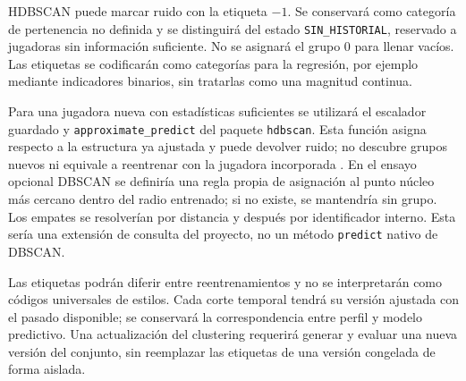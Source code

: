 HDBSCAN puede marcar ruido con la etiqueta $-1$. Se conservará como categoría de pertenencia no definida y se distinguirá del estado \texttt{SIN\_\allowbreak HISTORIAL}, reservado a jugadoras sin información suficiente. No se asignará el grupo 0 para llenar vacíos. Las etiquetas se codificarán como categorías para la regresión, por ejemplo mediante indicadores binarios, sin tratarlas como una magnitud continua.

Para una jugadora nueva con estadísticas suficientes se utilizará el escalador guardado y \texttt{approximate\_\allowbreak predict} del paquete \texttt{hdbscan}. Esta función asigna respecto a la estructura ya ajustada y puede devolver ruido; no descubre grupos nuevos ni equivale a reentrenar con la jugadora incorporada \cite{hdbscanPrediccionPerfiles}. En el ensayo opcional DBSCAN se definiría una regla propia de asignación al punto núcleo más cercano dentro del radio entrenado; si no existe, se mantendría sin grupo. Los empates se resolverían por distancia y después por identificador interno. Esta sería una extensión de consulta del proyecto, no un método \texttt{predict} nativo de DBSCAN.

Las etiquetas podrán diferir entre reentrenamientos y no se interpretarán como códigos universales de estilos. Cada corte temporal tendrá su versión ajustada con el pasado disponible; se conservará la correspondencia entre perfil y modelo predictivo. Una actualización del clustering requerirá generar y evaluar una nueva versión del conjunto, sin reemplazar las etiquetas de una versión congelada de forma aislada.

